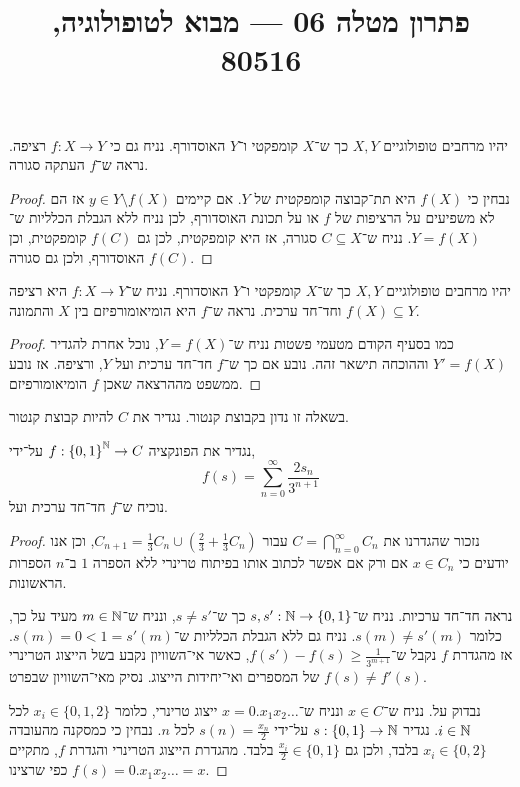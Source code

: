 
\title{פתרון מטלה 06 --- מבוא לטופולוגיה, 80516}


\maketitle
\maketitleprint[purple]

\question[2]
\subquestion{}
יהיו מרחבים טופולוגיים $X, Y$ כך ש־$X$ קומפקטי ו־$Y$ האוסדורף.
נניח גם כי $f : X \to Y$ רציפה.
נראה ש־$f$ העתקה סגורה.
\begin{proof}
	נבחין כי $f(X)$ היא תת־קבוצה קומפקטית של $Y$.
	אם קיימים $y \in Y \setminus f(X)$ אז הם לא משפיעים על הרציפות של $f$ או על תכונת האוסדורף, לכן נניח ללא הגבלת הכלליות ש־$Y = f(X)$.
	נניח ש־$C \subseteq X$ סגורה, אז היא קומפקטית, לכן גם $f(C)$ קומפקטית, וכן $f(C)$ האוסדורף, ולכן גם סגורה.
\end{proof}

\subquestion{}
יהיו מרחבים טופולוגיים $X, Y$ כך ש־$X$ קומפקטי ו־$Y$ האוסדורף.
נניח ש־$f : X \to Y$ היא רציפה וחד־חד ערכית.
נראה ש־$f$ היא הומיאומורפיזם בין $X$ והתמונה $f(X) \subseteq Y$.
\begin{proof}
	כמו בסעיף הקודם מטעמי פשטות נניח ש־$Y = f(X)$, נוכל אחרת להגדיר $Y' = f(X)$ וההוכחה תישאר זהה.
	נובע אם כך ש־$f$ חד־חד ערכית ועל $Y$, ורציפה.
	אז נובע ממשפט מההרצאה שאכן $f$ הומיאומורפיזם.
\end{proof}

\question{}
בשאלה זו נדון בקבוצת קנטור.
נגדיר את $C$ להיות קבוצת קנטור.

\subquestion[2]
נגדיר את הפונקציה $f : {\{0, 1\}}^{\mathbb{N}} \to C$ על־ידי,
\[
	f(s)
	= \sum_{n = 0}^\infty \frac{2 s_n}{3^{n + 1}}
\]
נוכיח ש־$f$ חד־חד ערכית ועל.
\begin{proof}
	נזכור שהגדרנו את $C = \bigcap_{n = 0}^\infty C_n$ עבור $C_{n + 1} = \frac{1}{3} C_n \cup (\frac{2}{3} + \frac{1}{3} C_n)$,
	וכן אנו יודעים כי $x \in C_n$ אם ורק אם אפשר לכתוב אותו בפיתוח טרינרי ללא הספרה $1$ ב־$n$ הספרות הראשונות.

	נראה חד־חד ערכיות.
	נניח ש־$s, s' : \mathbb{N} \to \{0, 1\}$ כך ש־$s \ne s'$, ונניח ש־$m \in \mathbb{N}$ מעיד על כך, כלומר $s(m) \ne s'(m)$.
	נניח גם ללא הגבלת הכלליות ש־$s(m) = 0 < 1 = s'(m)$.
	אז מהגדרת $f$ נקבל ש־$f(s') - f(s) \ge \frac{1}{3^{m + 1}}$, כאשר אי־השוויון נקבע בשל הייצוג הטרינרי של המספרים ואי־יחידות הייצוג.
	נסיק מאי־השוויון שבפרט $f(s) \ne f'(s)$.

	נבדוק על.
	נניח ש־$x \in C$ ונניח ש־$x = 0.x_1 x_2 \ldots$ ייצוג טרינרי, כלומר $x_i \in \{0, 1, 2\}$ לכל $i \in \mathbb{N}$.
	נגדיר $s : \{0, 1\} \to \mathbb{N}$ על־ידי $s(n) = \frac{x_n}{2}$ לכל $n$.
	נבחין כי כמסקנה מהעובדה $x_i \in \{0, 2\}$ בלבד, ולכן גם $\frac{x_i}{2} \in \{0, 1\}$ בלבד.
	מהגדרת הייצוג הטרינרי והגדרת $f$, מתקיים $f(s) = 0.x_1 x_2 \ldots = x$ כפי שרצינו.
\end{proof}

